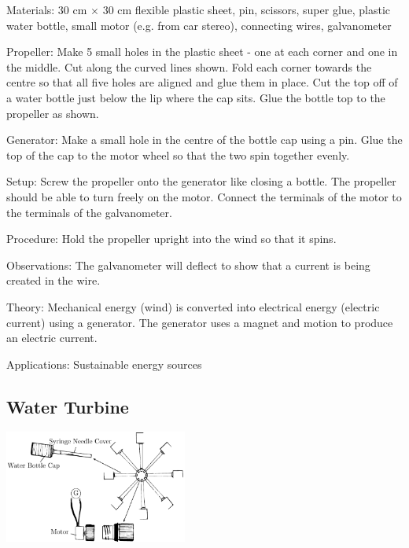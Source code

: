 \begin{multicols}{2}
\begin{description*}
\item[Materials:]{30 cm $\times$ 30 cm flexible plastic sheet, pin, scissors, super glue, plastic water bottle, small motor (e.g. from car stereo), connecting wires, galvanometer}
\item[Propeller:]{Make 5 small holes in the plastic sheet - one at each corner and one in the middle. Cut along the curved lines shown. Fold each corner towards the centre so that all five holes are aligned and glue them in place. Cut the top off of a water bottle just below the lip where the cap sits. Glue the bottle top to the propeller as shown. }
\item[Generator:]{Make a small hole in the centre of the bottle cap using a pin. Glue the top of the cap to the motor wheel so that the two spin together evenly.}
\item[Setup:]{Screw the propeller onto the generator like closing a bottle. The propeller should be able to turn freely on the motor. Connect the terminals of the motor to the terminals of the galvanometer.}
\item[Procedure:]{Hold the propeller upright into the wind so that it spins.}
\item[Observations:]{The galvanometer will deflect to show that a current is being created in the wire.}
\item[Theory:]{Mechanical energy (wind) is converted into electrical energy (electric current) using a generator. The generator uses a magnet and motion to produce an electric current.}
\item[Applications:]{Sustainable energy sources}
\end{description*}

\subsection{Water Turbine}

\begin{center}
\includegraphics[width=0.45\textwidth]{./img/water-turbine.png}
\end{center}


\end{multicols}
